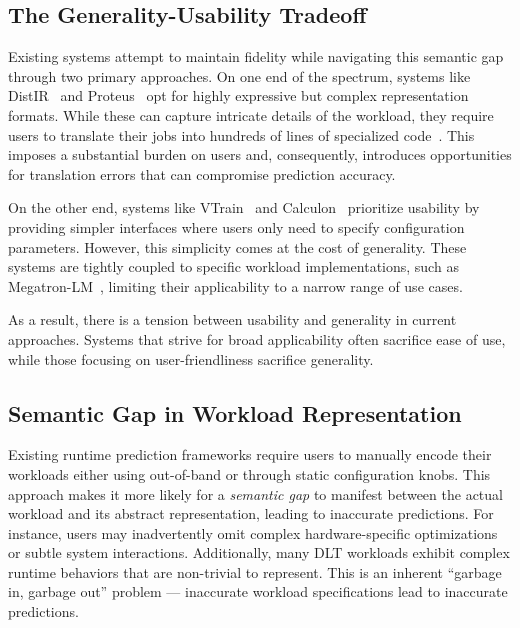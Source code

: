 \subsection{The Generality-Usability Tradeoff}
\label{sub:usability-tradeoff}

Existing systems attempt to maintain fidelity while navigating this semantic gap through two primary approaches. On one end of the spectrum, systems like DistIR~\cite{santhanam2021distir} and Proteus~\cite{duan2023proteus} opt for highly expressive but complex representation formats. While these can capture intricate details of the workload, they require users to translate their jobs into hundreds of lines of specialized code~\cite{distirgithub, proteusgithub}. This imposes a substantial burden on users and, consequently, introduces opportunities for translation errors that can compromise prediction accuracy.

On the other end, systems like VTrain~\cite{bang2023vtrain} and Calculon~\cite{isaev2023calculon} prioritize usability by providing simpler interfaces where users only need to specify configuration parameters. However, this simplicity comes at the cost of generality. These systems are tightly coupled to specific workload implementations, such as Megatron-LM~\cite{megatron}, limiting their applicability to a narrow range of use cases.

As a result, there is a tension between usability and generality in current approaches. Systems that strive for broad applicability often sacrifice ease of use, while those focusing on user-friendliness sacrifice generality.

\subsection{Semantic Gap in Workload Representation}
\label{sub:semantic-gap}

Existing runtime prediction frameworks require users to manually encode their workloads either using out-of-band \csl or through static configuration knobs. This approach makes it more likely for a \textit{semantic gap} to manifest between the actual workload and its abstract representation, leading to inaccurate predictions. For instance, users may inadvertently omit complex hardware-specific optimizations or subtle system interactions. Additionally, many DLT workloads exhibit complex runtime behaviors that are non-trivial to represent. This is an inherent ``garbage in, garbage out'' problem --- inaccurate workload specifications lead to inaccurate predictions.





